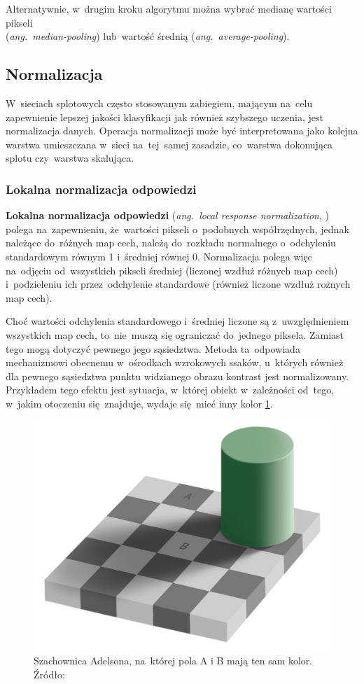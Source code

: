 Alternatywnie, w~drugim kroku algorytmu można wybrać medianę wartości pikseli\\
(\textit{ang.~median-pooling}) lub~wartość średnią (\textit{ang.~average-pooling}).

\subsection{Normalizacja}
W~sieciach splotowych często stosowanym zabiegiem, mającym na~celu zapewnienie lepszej jakości klasyfikacji jak również
szybszego uczenia, jest normalizacja danych. Operacja normalizacji może być interpretowana jako kolejna warstwa
umieszczana w~sieci na~tej~samej zasadzie, co~warstwa dokonująca splotu czy~warstwa skalująca.

\subsubsection{Lokalna normalizacja odpowiedzi} \label{sssec:normalizacja_odpowiedzi}
\textbf{Lokalna normalizacja odpowiedzi} (\textit{ang.~local response normalization}, \cite{HOG}) polega na~zapewnieniu,
że~wartości pikseli o~podobnych współrzędnych, jednak należące do~różnych map cech, należą do~rozkładu normalnego
o~odchyleniu standardowym równym 1 i~średniej równej 0. Normalizacja polega więc na~odjęciu od~wszystkich pikseli
średniej (liczonej wzdłuż różnych map cech) i~podzieleniu ich przez~odchylenie standardowe (również liczone wzdłuż
rożnych map cech).

Choć wartości odchylenia standardowego i~średniej liczone są z~uwzględnieniem wszystkich map cech, to~nie~muszą
się ograniczać do~jednego piksela. Zamiast tego mogą dotyczyć pewnego jego sąsiedztwa. Metoda ta~odpowiada
mechanizmowi obecnemu w~ośrodkach wzrokowych ssaków, u~których również dla pewnego sąsiedztwa punktu widzianego
obrazu kontrast jest normalizowany. Przykładem tego efektu jest sytuacja, w~której obiekt w~zależności od~tego,
w~jakim otoczeniu się~znajduje, wydaje się~mieć inny kolor \ref{img:chess-illusion}.

\begin{figure}[H]
	\centering
	\includegraphics[width=0.8\linewidth]{img/chess-illusion.png}
	\caption{Szachownica Adelsona, na~której pola A i B mają ten sam kolor. Źródło: \cite{adelson-checker-illusion}}
	\label{img:chess-illusion}
\end{figure}

